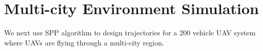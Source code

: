 \section{Multi-city Environment Simulation \label{sec:bayArea_sim}}
We next use SPP algorithm to design trajectories for a 200 vehicle UAV system where UAVs are flying through a multi-city region.